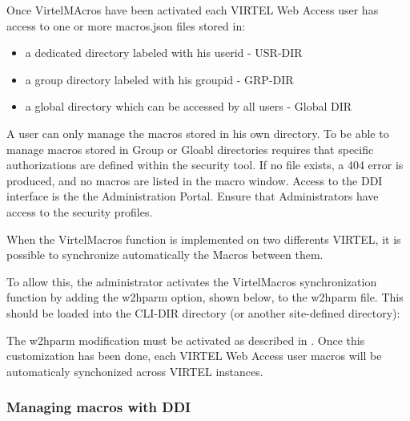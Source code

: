 \documentclass[letterpaper,10pt,english]{sphinxmanual}
\begin{document}
Once VirtelMAcros have been activated each VIRTEL Web Access user has access to one or more macros.json files stored in:
\begin{itemize}
\item {} 
a dedicated directory labeled with his userid - USR-DIR

\item {} 
a group directory labeled with his groupid - GRP-DIR

\item {} 
a global directory which can be accessed by all users - Global DIR

\end{itemize}

A user can only manage the macros stored in his own directory. To be able to manage macros stored in Group or Gloabl directories requires that specific authorizations are defined within the security tool. If no file exists, a 404 error is produced, and no macros are listed in the macro window. Access to the DDI interface is the the Administration Portal. Ensure that Administrators have access to the security profiles.


When the VirtelMacros function is implemented on two differents VIRTEL, it is possible to synchronize automatically the Macros between them.

To allow this, the administrator activates the VirtelMacros synchronization function by adding the w2hparm option, shown below, to the w2hparm file. This should be loaded into the CLI-DIR directory (or another site-defined directory):

\begin{sphinxVerbatim}[commandchars=\\\{\}]
  
\end{sphinxVerbatim}

The w2hparm modification must be activated as described in {\hyperref[\detokenize{User_Guide:v457ug-customizing-with-option}]{}}. Once this customization has been done, each VIRTEL Web Access user macros will be automaticaly synchonized across VIRTEL instances.


\subsubsection{Managing macros with DDI}
\label{\detokenize{User_Guide:managing-macros-with-ddi}}
\end{document}

